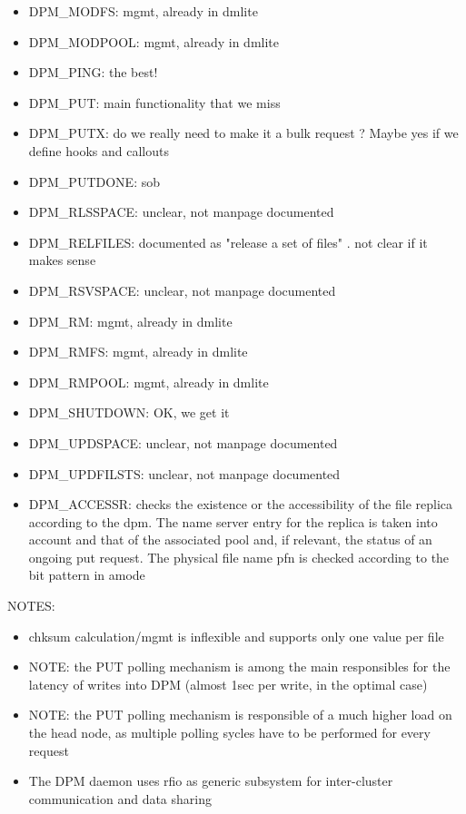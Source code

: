\documentclass[a4paper,10pt]{scrreprt}
\begin{document}
\begin{itemize}
\item DPM\_MODFS: mgmt, already in dmlite

\item DPM\_MODPOOL: mgmt, already in dmlite

\item DPM\_PING: the best!

\item DPM\_PUT: main functionality that we miss
\item DPM\_PUTX: do we really need to make it a bulk request ? Maybe yes if we define hooks and callouts

\item DPM\_PUTDONE: sob

\item DPM\_RLSSPACE: unclear, not manpage documented

\item DPM\_RELFILES: documented as "release a set of files" . not clear if it makes sense

\item DPM\_RSVSPACE: unclear, not manpage documented

\item DPM\_RM: mgmt, already in dmlite

\item DPM\_RMFS: mgmt, already in dmlite

\item DPM\_RMPOOL: mgmt, already in dmlite

\item DPM\_SHUTDOWN: OK, we get it

\item DPM\_UPDSPACE: unclear, not manpage documented

\item DPM\_UPDFILSTS: unclear, not manpage documented

\item DPM\_ACCESSR: checks the existence  or  the  accessibility  of  the  file
       replica  according to the dpm. The name server entry for the replica is
       taken into account and that of the associated pool  and,  if  relevant,
       the  status  of  an ongoing put request.  The physical file name pfn is
       checked according to the bit pattern in amode

\end{itemize}

NOTES:
\begin{itemize}
 \item chksum calculation/mgmt is inflexible and supports only one value per file
 \item NOTE: the PUT polling mechanism is among the main responsibles for the latency of writes into DPM (almost 1sec per write, in the optimal case)
 \item NOTE: the PUT polling mechanism is responsible of a much higher load on the head node, as multiple polling sycles have to be performed for every request
  \item The DPM daemon uses rfio as generic subsystem for inter-cluster communication and data sharing
\end{itemize}
\end{document}
